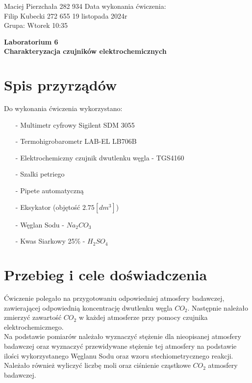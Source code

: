 \documentclass[11pt]{article}
\begin{document}
    \begin{flushleft}
        Maciej Pierzchała 282 934 \hfill Data wykonania ćwiczenia:\\
        Filip Kubecki 272 655 \hfill 19 listopada 2024r\\
        Grupa: Wtorek 10:35 \\
    \end{flushleft}
    \begin{center}
        \Large\textbf{Laboratorium 6}\\
        \textbf{Charakteryzacja czujników elektrochemicznych}
    \end{center}
    \hfill
    \section{Spis przyrządów}
    \par{
        Do wykonania ćwiczenia wykorzystano:
        \begin{itemize}
            \setlength\itemsep{0em}
            \item[-] Multimetr cyfrowy Sigilent SDM 3055
            \item[-] Termohigrobarometr LAB-EL LB706B
            \item[-] Elektrochemiczny czujnik dwutlenku węgla - TGS4160
            \item[-] Szalki petriego
            \item[-] Pipete automatyczną
            \item[-] Eksykator (objętość $2.75[dm^3]$)
            \item[-] Węglan Sodu - $Na_2CO_3$
            \item[-] Kwas Siarkowy 25\% - $H_{2}SO_4$
        \end{itemize}
    }
    \section{Przebieg i cele doświadczenia}
    \par Ćwiczenie polegało na przygotowaniu odpowiedniej atmosfery badawczej, zawierającej odpowiednią koncentrację
    dwutlenku węgla $CO_{2}$. Następnie należało zmierzyć zawartość $CO_2$ w każdej atmosferze przy pomocy czujnika elektrochemicznego.\\
    \indent Na podstawie pomiarów należało wyznaczyć stężenie dla nieopisanej atmosfery badawczej oraz wyznaczyć przewidywane stężenie tej atmosfery
    na podstawie ilości wykorzystanego Węglanu Sodu oraz wzoru stechiometrycznego reakcji. Należało również wyliczyć liczbę moli oraz ciśnienie cząstkowe
    $CO_2$ atmosfery badawczej.
\end{document}
